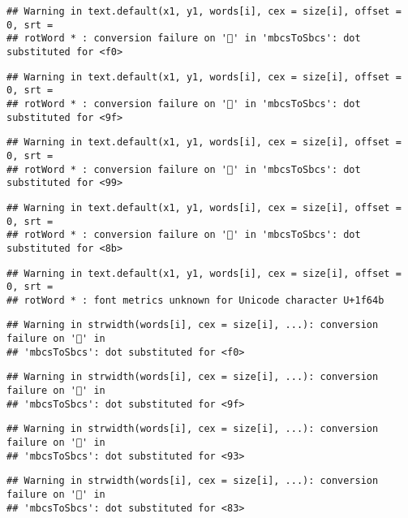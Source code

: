 \documentclass[
]{article}
\begin{document}
\begin{verbatim}
## Warning in text.default(x1, y1, words[i], cex = size[i], offset = 0, srt =
## rotWord * : conversion failure on '🙋' in 'mbcsToSbcs': dot substituted for <f0>
\end{verbatim}

\begin{verbatim}
## Warning in text.default(x1, y1, words[i], cex = size[i], offset = 0, srt =
## rotWord * : conversion failure on '🙋' in 'mbcsToSbcs': dot substituted for <9f>
\end{verbatim}

\begin{verbatim}
## Warning in text.default(x1, y1, words[i], cex = size[i], offset = 0, srt =
## rotWord * : conversion failure on '🙋' in 'mbcsToSbcs': dot substituted for <99>
\end{verbatim}

\begin{verbatim}
## Warning in text.default(x1, y1, words[i], cex = size[i], offset = 0, srt =
## rotWord * : conversion failure on '🙋' in 'mbcsToSbcs': dot substituted for <8b>
\end{verbatim}

\begin{verbatim}
## Warning in text.default(x1, y1, words[i], cex = size[i], offset = 0, srt =
## rotWord * : font metrics unknown for Unicode character U+1f64b
\end{verbatim}

\begin{verbatim}
## Warning in strwidth(words[i], cex = size[i], ...): conversion failure on '📃' in
## 'mbcsToSbcs': dot substituted for <f0>
\end{verbatim}

\begin{verbatim}
## Warning in strwidth(words[i], cex = size[i], ...): conversion failure on '📃' in
## 'mbcsToSbcs': dot substituted for <9f>
\end{verbatim}

\begin{verbatim}
## Warning in strwidth(words[i], cex = size[i], ...): conversion failure on '📃' in
## 'mbcsToSbcs': dot substituted for <93>
\end{verbatim}

\begin{verbatim}
## Warning in strwidth(words[i], cex = size[i], ...): conversion failure on '📃' in
## 'mbcsToSbcs': dot substituted for <83>
\end{verbatim}
\end{document}
